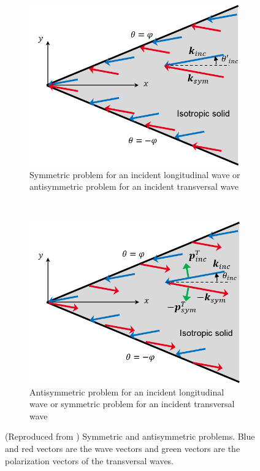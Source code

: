 \begin{figure}[h]
    \centering
    \begin{subfigure}[b]{0.45\textwidth}
        \includegraphics[width=\textwidth]{images/chapter1/SymPb.png}
        \caption{Symmetric problem for an incident longitudinal wave or antisymmetric problem for an incident transversal wave}
        \label{Sym}
    \end{subfigure}
    ~ 
    \begin{subfigure}[b]{0.45\textwidth}
        \includegraphics[width=\textwidth]{images/chapter1/AntisymPb.png}
        \caption{Antisymmetric problem for an incident longitudinal wave or symmetric problem for an incident transversal wave}
        \label{Antisym}
    \end{subfigure}
    \caption{(Reproduced from \cite{AKDthese}) Symmetric and antisymmetric problems. Blue and red vectors are the wave vectors and green vectors are the polarization vectors of the transversal waves.}
    \label{SymAntisym}
\end{figure}

